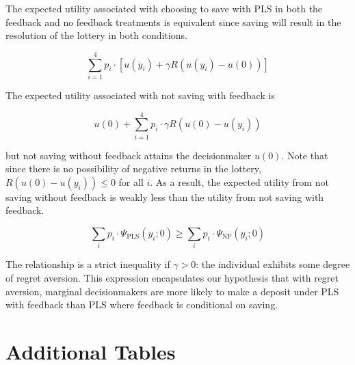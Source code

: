 \documentclass[12pt]{article}
\begin{document}
	The expected utility associated with choosing to save with PLS in both the feedback and no feedback treatments is equivalent since saving will result in the resolution of the lottery in both conditions.

		\[ \sum_{i=1}^{4} p_i \cdot \left [ u(y_i) + \gamma R(u(y_i) - u(0)) \right ] \]

	The expected utility associated with not saving with feedback is

		\[ u(0) + \sum_{i=1}^{4} p_i \cdot \gamma R(u(0)-u(y_i)) \]

	\noindent but not saving without feedback attains the decisionmaker $u(0)$. Note that since there is no possibility of negative returns in the lottery, $R(u(0) - u(y_i)) \leq 0$ for all $i$. As a result, the expected utility from not saving without feedback is weakly less than the utility from not saving with feedback.

	\[ \sum_{i} p_{i} \cdot \Psi_\text{PLS} (y_i; 0)  \geq \sum_{i} p_{i} \cdot \Psi_\text{NF} (y_i; 0) \]

	The relationship is a strict inequality if $\gamma > 0$: the individual exhibits some degree of regret aversion. This expression encapsulates our hypothesis that with regret aversion, marginal decisionmakers are more likely to make a deposit under PLS with feedback than PLS where feedback is conditional on saving.



	\clearpage

\section{Additional Tables}
	
	
	
	
	
	

	\clearpage
\end{document}
